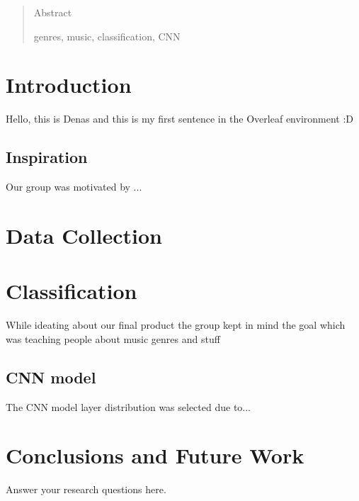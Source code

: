 \documentclass[11pt,fleqn]{report}
\begin{document}
 
\makecoverpage
\tableofcontents
\begin{abstract}      
  Abstract

  
  \begin{keywords}    
   genres, music, classification, CNN
  \end{keywords}
\end{abstract}


\chapter{Introduction} 
Hello, this is Denas and this is my first sentence in the Overleaf environment :D

\section{Inspiration}
Our group was motivated by ...

\chapter{Data Collection}

\chapter{Classification}
While ideating about our final product the group kept in mind the goal which was teaching people about music genres and stuff
\section{CNN model}
The CNN model layer distribution was selected due to...

\chapter{Conclusions and Future Work}
Answer your research questions here.



\end{document}
